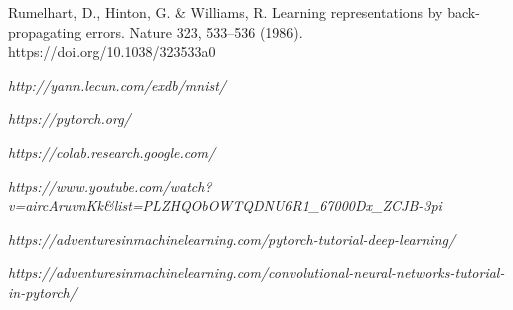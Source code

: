 \documentclass[12pt]{acmart}
\begin{document}
\begin{thebibliography}{}
    Rumelhart, D., Hinton, G. & Williams, R. Learning representations by back-propagating errors. Nature 323, 533–536 (1986). https://doi.org/10.1038/323533a0

    \textit{http://yann.lecun.com/exdb/mnist/}

    
    \textit{https://pytorch.org/}

    \textit{https://colab.research.google.com/}

    \textit{https://www.youtube.com/watch?v=aircAruvnKk&list=PLZHQObOWTQDNU6R1\_67000Dx\_ZCJB-3pi}
    
    \textit{https://adventuresinmachinelearning.com/pytorch-tutorial-deep-learning/}
    
    \textit{https://adventuresinmachinelearning.com/convolutional-neural-networks-tutorial-in-pytorch/}

\end{thebibliography}
\end{document}
